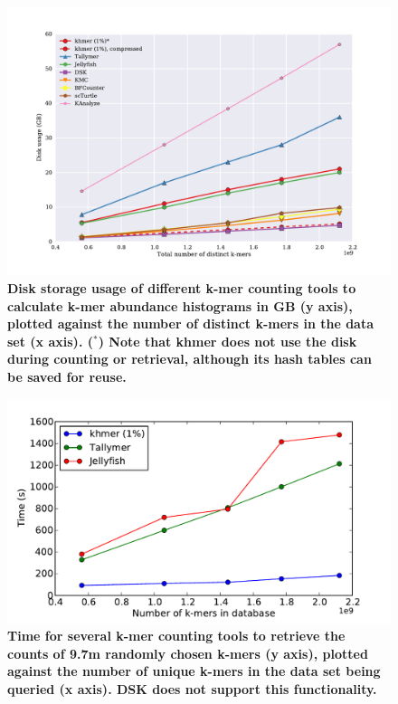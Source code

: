 \documentclass[10pt]{article}
\begin{document}
\begin{figure}[!ht]
\centerline{\includegraphics[width=5in]{./figure/disk_benchmark}}

\caption{\bf Disk storage usage of different k-mer counting tools to
  calculate k-mer abundance histograms in GB (y axis), plotted against
  the number of distinct k-mers in the data set (x axis).  ($^*$) Note
  that khmer does not use the disk during counting or retrieval,
  although its hash tables can be saved for reuse.}

\label{fig:cmp_disk}
\end{figure}

\begin{figure}[!ht]
\centerline{\includegraphics[width=5in]{./figure/count_benchmark}}
\caption{\bf Time for several k-mer counting tools to retrieve the counts of 9.7m randomly 
chosen k-mers (y axis), plotted against the number of unique k-mers in the data set 
being queried (x axis).  DSK does not support this functionality.}
\label{fig:cmp_count}
\end{figure}
\end{document}
